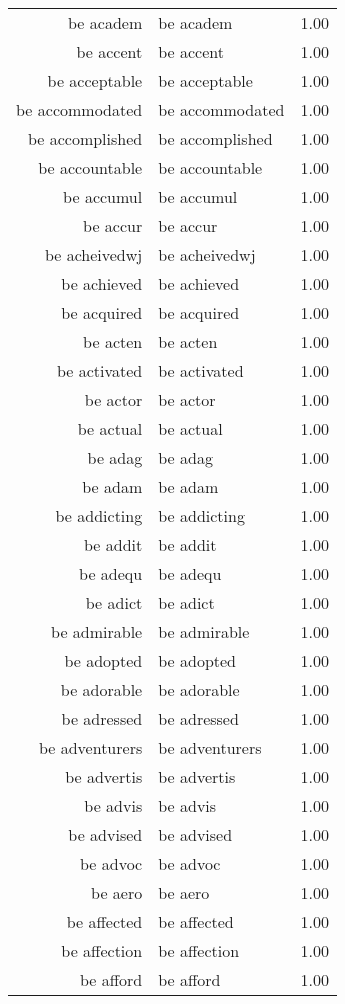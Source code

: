 \begin{table}[ht]
\begin{tabular}{rlr}
  be academ & be academ & 1.00 \\ 
  be accent & be accent & 1.00 \\ 
  be acceptable & be acceptable & 1.00 \\ 
  be accommodated & be accommodated & 1.00 \\ 
  be accomplished & be accomplished & 1.00 \\ 
  be accountable & be accountable & 1.00 \\ 
  be accumul & be accumul & 1.00 \\ 
  be accur & be accur & 1.00 \\ 
  be acheivedwj & be acheivedwj & 1.00 \\ 
  be achieved & be achieved & 1.00 \\ 
  be acquired & be acquired & 1.00 \\ 
  be acten & be acten & 1.00 \\ 
  be activated & be activated & 1.00 \\ 
  be actor & be actor & 1.00 \\ 
  be actual & be actual & 1.00 \\ 
  be adag & be adag & 1.00 \\ 
  be adam & be adam & 1.00 \\ 
  be addicting & be addicting & 1.00 \\ 
  be addit & be addit & 1.00 \\ 
  be adequ & be adequ & 1.00 \\ 
  be adict & be adict & 1.00 \\ 
  be admirable & be admirable & 1.00 \\ 
  be adopted & be adopted & 1.00 \\ 
  be adorable & be adorable & 1.00 \\ 
  be adressed & be adressed & 1.00 \\ 
  be adventurers & be adventurers & 1.00 \\ 
  be advertis & be advertis & 1.00 \\ 
  be advis & be advis & 1.00 \\ 
  be advised & be advised & 1.00 \\ 
  be advoc & be advoc & 1.00 \\ 
  be aero & be aero & 1.00 \\ 
  be affected & be affected & 1.00 \\ 
  be affection & be affection & 1.00 \\ 
  be afford & be afford & 1.00 \\ 

\end{tabular}
\end{table}
